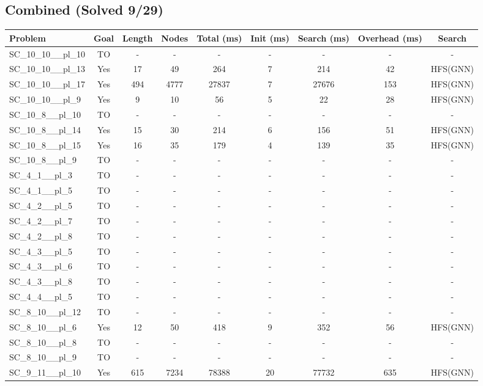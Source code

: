\documentclass{article}
\begin{document}
\subsection*{Combined (Solved 9/29)}
\begin{tabular}{lcccccccc}
\toprule
Problem & Goal & Length & Nodes & Total (ms) & Init (ms) & Search (ms) & Overhead (ms) & Search \\
\midrule
SC\_10\_10\_\_pl\_10 & TO & - & - & - & - & - & - & - \\
SC\_10\_10\_\_pl\_13 & Yes & 17 & 49 & 264 & 7 & 214 & 42 & HFS(GNN) \\
SC\_10\_10\_\_pl\_17 & Yes & 494 & 4777 & 27837 & 7 & 27676 & 153 & HFS(GNN) \\
SC\_10\_10\_\_pl\_9 & Yes & 9 & 10 & 56 & 5 & 22 & 28 & HFS(GNN) \\
SC\_10\_8\_\_pl\_10 & TO & - & - & - & - & - & - & - \\
SC\_10\_8\_\_pl\_14 & Yes & 15 & 30 & 214 & 6 & 156 & 51 & HFS(GNN) \\
SC\_10\_8\_\_pl\_15 & Yes & 16 & 35 & 179 & 4 & 139 & 35 & HFS(GNN) \\
SC\_10\_8\_\_pl\_9 & TO & - & - & - & - & - & - & - \\
SC\_4\_1\_\_pl\_3 & TO & - & - & - & - & - & - & - \\
SC\_4\_1\_\_pl\_5 & TO & - & - & - & - & - & - & - \\
SC\_4\_2\_\_pl\_5 & TO & - & - & - & - & - & - & - \\
SC\_4\_2\_\_pl\_7 & TO & - & - & - & - & - & - & - \\
SC\_4\_2\_\_pl\_8 & TO & - & - & - & - & - & - & - \\
SC\_4\_3\_\_pl\_5 & TO & - & - & - & - & - & - & - \\
SC\_4\_3\_\_pl\_6 & TO & - & - & - & - & - & - & - \\
SC\_4\_3\_\_pl\_8 & TO & - & - & - & - & - & - & - \\
SC\_4\_4\_\_pl\_5 & TO & - & - & - & - & - & - & - \\
SC\_8\_10\_\_pl\_12 & TO & - & - & - & - & - & - & - \\
SC\_8\_10\_\_pl\_6 & Yes & 12 & 50 & 418 & 9 & 352 & 56 & HFS(GNN) \\
SC\_8\_10\_\_pl\_8 & TO & - & - & - & - & - & - & - \\
SC\_8\_10\_\_pl\_9 & TO & - & - & - & - & - & - & - \\
SC\_9\_11\_\_pl\_10 & Yes & 615 & 7234 & 78388 & 20 & 77732 & 635 & HFS(GNN) \\

\end{tabular}
\end{document}
